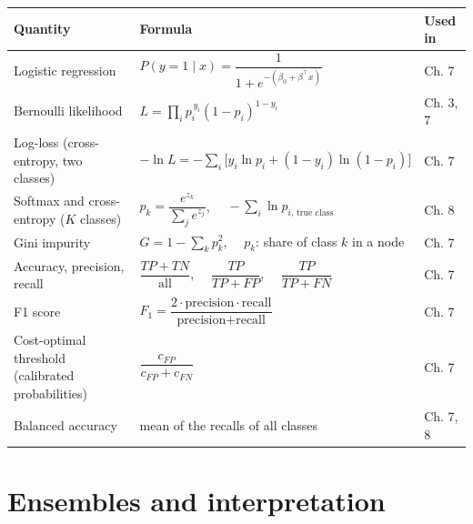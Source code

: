 \documentclass[
  letterpaper,
  DIV=11,
  numbers=noendperiod]{scrreprt}
\begin{document}
\begin{longtable}[]{@{}
  >{\raggedright\arraybackslash}p{}
  >{\raggedright\arraybackslash}p{}
  >{\raggedright\arraybackslash}p{}@{}}
\toprule\noalign{}
\begin{minipage}[b]{\linewidth}\raggedright
Quantity
\end{minipage} & \begin{minipage}[b]{\linewidth}\raggedright
Formula
\end{minipage} & \begin{minipage}[b]{\linewidth}\raggedright
Used in
\end{minipage} \\
\midrule\noalign{}
\endhead
\bottomrule\noalign{}
\endlastfoot
Logistic regression &
\(P(y = 1 \mid x) = \dfrac{1}{1 + e^{-(\beta_0 + \beta^\top x)}}\) & Ch.
7 \\
Bernoulli likelihood & \(L = \prod_i p_i^{\,y_i}(1 - p_i)^{1 - y_i}\) &
Ch. 3, 7 \\
Log-loss (cross-entropy, two classes) &
\(-\ln L = -\sum_i \big[y_i \ln p_i + (1 - y_i)\ln(1 - p_i)\big]\) & Ch.
7 \\
Softmax and cross-entropy (\(K\) classes) &
\(p_k = \dfrac{e^{z_k}}{\sum_{j} e^{z_j}}\),
\(\quad -\sum_i \ln p_{i,\,\text{true class}}\) & Ch. 8 \\
Gini impurity & \(G = 1 - \sum_k p_k^2\), \(\quad p_k\): share of class
\(k\) in a node & Ch. 7 \\
Accuracy, precision, recall & \(\dfrac{TP + TN}{\text{all}}\),
\(\quad \dfrac{TP}{TP + FP}\), \(\quad \dfrac{TP}{TP + FN}\) & Ch. 7 \\
F1 score &
\(F_1 = \dfrac{2 \cdot \text{precision} \cdot \text{recall}}{\text{precision} + \text{recall}}\)
& Ch. 7 \\
Cost-optimal threshold (calibrated probabilities) &
\(\dfrac{c_{FP}}{c_{FP} + c_{FN}}\) & Ch. 7 \\
Balanced accuracy & mean of the recalls of all classes & Ch. 7, 8 \\
\end{longtable}

\section{Ensembles and
interpretation}\label{ensembles-and-interpretation}
\end{document}
